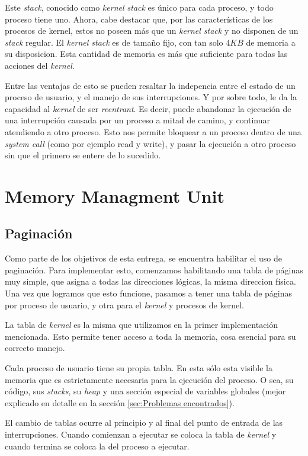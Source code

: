 \documentclass[a4paper,10pt]{article}
\begin{document}
Este \textit{stack}, conocido como \textit{kernel stack} es único para cada proceso, y todo proceso tiene uno.
Ahora, cabe destacar que, por las características de los procesos de kernel, estos no poseen más que un \textit{kernel stack} y no disponen de un \textit{stack} regular.
El \textit{kernel stack} es de tamaño fijo, con tan solo $ 4KB $ de memoria a su disposicion.
Esta cantidad de memoria es más que suficiente para todas las acciones del \textit{kernel}.

Entre las ventajas de esto se pueden resaltar la indepencia entre el estado de un proceso de usuario, y el manejo de sus interrupciones.
Y por sobre todo, le da la capacidad al \textit{kernel} de ser \textit{reentrant}.
Es decir, puede abandonar la ejecución de una interrupción causada por un proceso a mitad de camino, y continuar atendiendo a otro proceso.
Esto nos permite bloquear a un proceso dentro de una \textit{system call} (como por ejemplo read y write), y pasar la ejecución a otro proceso sin que el primero 
se entere de lo sucedido.

\newpage
\section{Memory Managment Unit}

\subsection{Paginación}
\label{sec:Paginación}
Como parte de los objetivos de esta entrega, se encuentra habilitar el uso de paginación.
Para implementar esto, comenzamos habilitando una tabla de páginas muy simple, que asigna a todas las direcciones lógicas, la misma direccion física.
Una vez que logramos que esto funcione, pasamos a tener una tabla de páginas por proceso de usuario, y otra para el \textit{kernel} y procesos de kernel.

La tabla de \textit{kernel} es la misma que utilizamos en la primer implementación mencionada.
Esto permite tener acceso a toda la memoria, cosa esencial para su correcto manejo.

Cada proceso de usuario tiene su propia tabla.
En esta sólo esta visible la memoria que es estrictamente necesaria para la ejecución del proceso.
O sea, su código, sus \textit{stacks}, su \textit{heap} y una sección especial de variables globales (mejor explicado en detalle en la sección  
\ref{sec:Problemas encontrados}).

El cambio de tablas ocurre al principio y al final del punto de entrada de las interrupciones.
Cuando comienzan a ejecutar se coloca la tabla de \textit{kernel} y cuando termina se coloca la del proceso a ejecutar.
\end{document}
